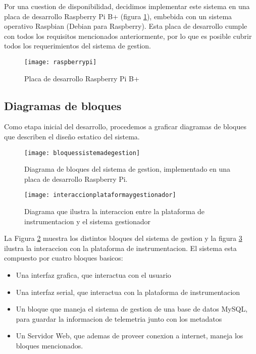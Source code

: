Por una cuestion de disponibilidad, decidimos implementar este sistema en una placa de desarrollo Raspberry Pi B+ (figura \ref{fig:raspberrypi}), embebida con un sistema operativo Raspbian (Debian para Raspberry). Esta placa de desarrollo cumple con todos los requisitos mencionados anteriormente, por lo que es posible cubrir todos los requerimientos del sistema de gestion.

\begin{figure}[h]
  \centering
  \texttt{[image: raspberrypi]}
  \caption{Placa de desarrollo Raspberry Pi B+}\label{fig:raspberrypi}
\end{figure}

\subsection{Diagramas de bloques} %
\label{sub:diagramas_de_bloques}

Como etapa inicial del desarrollo, procedemos a graficar diagramas de bloques que describen el diseño estatico del sistema.

\begin{figure}[h]
  \centering
  \texttt{[image: bloquessistemadegestion]}
  \caption{Diagrama de bloques del sistema de gestion, implementado en una placa de desarrollo Raspberry Pi.}\label{fig:bloquessistemadegestion}
\end{figure}

\begin{figure}[h]
  \centering
  \texttt{[image: interaccionplataformaygestionador]}
  \caption{Diagrama que ilustra la interaccion entre la plataforma de instrumentacion y el sistema gestionador}\label{fig:interaccionplataformaygestionador}
\end{figure}

La Figura \ref{fig:bloquessistemadegestion} muestra los distintos bloques del sistema de gestion y la figura \ref{fig:interaccionplataformaygestionador} ilustra la interaccion con la plataforma de instrumentacion. El sistema esta compuesto por cuatro bloques basicos:

\begin{itemize}
	\item Una interfaz grafica, que interactua con el usuario
	\item Una interfaz serial, que interactua con la plataforma de instrumentacion
	\item Un bloque que maneja el sistema de gestion de una base de datos MySQL, para guardar la informacion de telemetria junto con los metadatos
	\item Un Servidor Web, que ademas de proveer conexion a internet, maneja los bloques mencionados.
\end{itemize}


